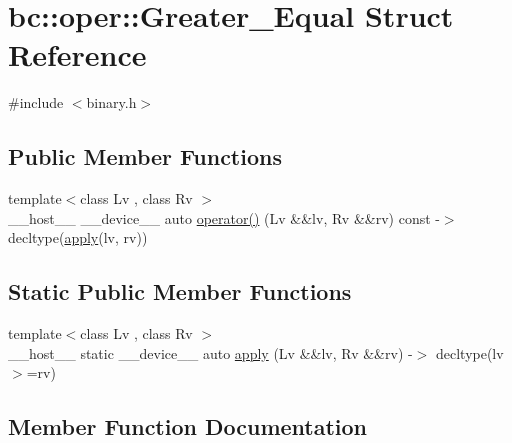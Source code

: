 \hypertarget{structbc_1_1oper_1_1Greater__Equal}{}\section{bc\+:\+:oper\+:\+:Greater\+\_\+\+Equal Struct Reference}
\label{structbc_1_1oper_1_1Greater__Equal}


{\ttfamily \#include $<$binary.\+h$>$}

\subsection*{Public Member Functions}
\begin{DoxyCompactItemize}
\item 
{\footnotesize template$<$class Lv , class Rv $>$ }\\\+\_\+\+\_\+host\+\_\+\+\_\+ \+\_\+\+\_\+device\+\_\+\+\_\+ auto \hyperlink{structbc_1_1oper_1_1Greater__Equal_a6b756064469789a4413c5f114c4b20a1}{operator()} (Lv \&\&lv, Rv \&\&rv) const -\/$>$ decltype(\hyperlink{structbc_1_1oper_1_1Greater__Equal_aad0b6466718adb499ff41255b9e1b1fa}{apply}(lv, rv))
\end{DoxyCompactItemize}
\subsection*{Static Public Member Functions}
\begin{DoxyCompactItemize}
\item 
{\footnotesize template$<$class Lv , class Rv $>$ }\\\+\_\+\+\_\+host\+\_\+\+\_\+ static \+\_\+\+\_\+device\+\_\+\+\_\+ auto \hyperlink{structbc_1_1oper_1_1Greater__Equal_aad0b6466718adb499ff41255b9e1b1fa}{apply} (Lv \&\&lv, Rv \&\&rv) -\/$>$ decltype(lv $>$=rv)
\end{DoxyCompactItemize}


\subsection{Member Function Documentation}
\mbox{\label{structbc_1_1oper_1_1Greater__Equal_aad0b6466718adb499ff41255b9e1b1fa}} 
